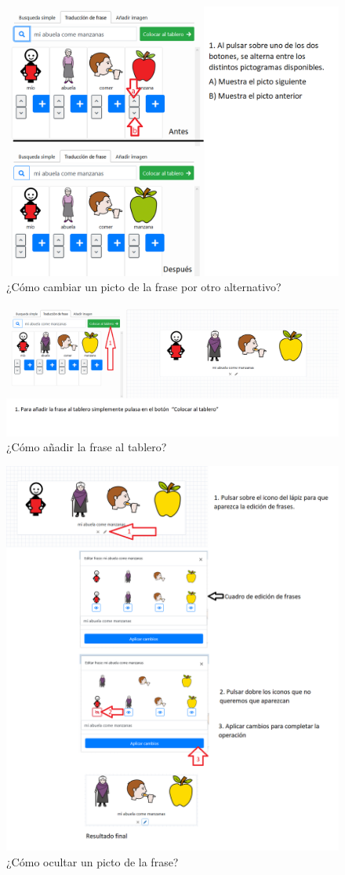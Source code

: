 \begin{figure}[h!]
	\centering
	\includegraphics[width=0.7\linewidth]{Imagenes/Bitmap/Tarea3-Pista2}
	\caption{¿Cómo cambiar un picto de la frase por otro alternativo?}
	\label{fig:tarea3-pista2}
\end{figure}



\begin{figure}[h!]
	\centering
	\includegraphics[width=0.7\linewidth]{Imagenes/Bitmap/Tarea3-Pista3}
	\caption{¿Cómo añadir la frase al tablero?}
	\label{fig:tarea3-pista3}
\end{figure}

\begin{figure}[h!]
	\centering
	\includegraphics[width=0.7\linewidth]{Imagenes/Bitmap/Tarea3-Pista4}
	\caption{¿Cómo ocultar un picto de la frase?}
	\label{fig:tarea3-pista4}
\end{figure}


